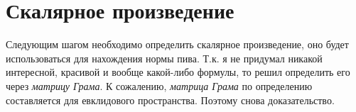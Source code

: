 \section*{Скалярное произведение}
Следующим шагом необходимо определить скалярное произведение,
оно будет использоваться для нахождения нормы пива.
Т.к. я не придумал никакой интересной,
красивой и вообще какой-либо формулы,
то решил определить его через \textit{матрицу Грама}.
К сожалению, \textit{матрица Грама} по определению
составляется для евклидового пространства. Поэтому снова доказательство.

